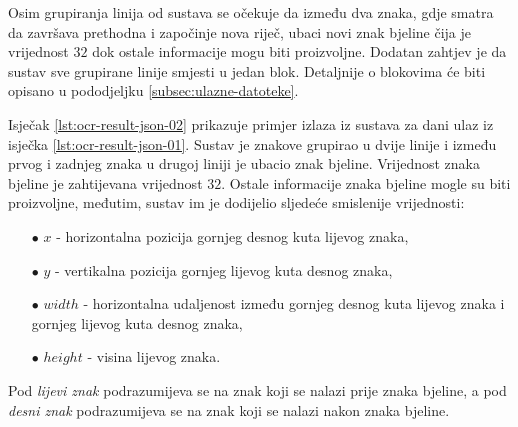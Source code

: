 \documentclass[times, utf8, zavrsni]{fer}
\begin{document}
Osim grupiranja linija od sustava se očekuje da između dva znaka, gdje smatra da
završava prethodna i započinje nova riječ, ubaci novi znak bjeline čija je
vrijednost  $32$ dok ostale informacije mogu biti proizvoljne.
Dodatan zahtjev je da sustav sve grupirane linije smjesti u jedan blok.
Detaljnije o blokovima će biti opisano u pododjeljku
\ref{subsec:ulazne-datoteke}.

Isječak \ref{lst:ocr-result-json-02} prikazuje primjer izlaza iz sustava za dani
ulaz iz isječka \ref{lst:ocr-result-json-01}. Sustav je znakove grupirao u dvije
linije i između prvog i zadnjeg znaka u drugoj liniji je ubacio znak bjeline.
Vrijednost znaka bjeline je zahtijevana vrijednost $32$. Ostale informacije
znaka bjeline mogle su biti proizvoljne, međutim, sustav im je dodijelio
sljedeće smislenije vrijednosti:\begin{itemize}
    \item[$\bullet$] $x$ - horizontalna pozicija gornjeg desnog kuta lijevog
                           znaka,
    \item[$\bullet$] $y$ - vertikalna pozicija gornjeg lijevog kuta desnog
                           znaka,
    \item[$\bullet$] $width$ - horizontalna udaljenost između gornjeg desnog
                               kuta lijevog znaka i gornjeg lijevog kuta desnog
                               znaka,
    \item[$\bullet$] $height$ - visina lijevog znaka.
\end{itemize}

Pod \emph{lijevi znak} podrazumijeva se na znak koji se nalazi prije znaka
bjeline, a pod \emph{desni znak} podrazumijeva se na znak koji se nalazi nakon
znaka bjeline.
\end{document}
